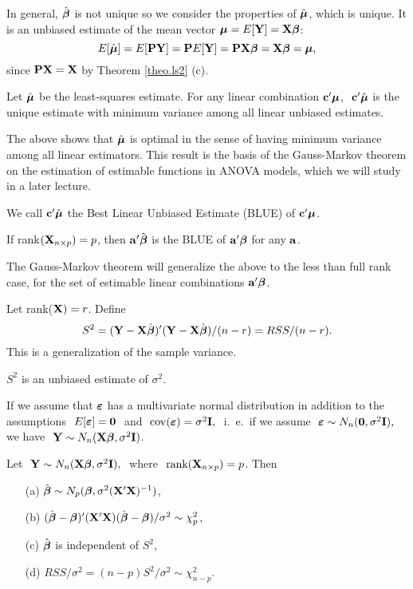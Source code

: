 \documentclass[11pt]{article}
\newcommand{\bdefi}{\vb\begin{defi}}
\newcommand{\esdefi}{\end{defi}}
\newcommand{\btheo}{\vb\begin{theo}}
\newcommand{\etheo}{\end{theo}\vb}
\newcommand{\bstheo}{\begin{theo}}
\newcommand{\estheo}{\end{theo}}
\newcommand{\bnote}{\vb\begin{note}}
\newcommand{\enote}{\end{note}\vb}
\newcommand{\bsnote}{\begin{note}}
\newcommand{\esnote}{\end{note}}
\begin{document}
\bnote
In general, $\hat{\mbox{\boldmath $\beta$}}$ is not unique so we consider the properties
of $\hat{\mbox{\boldmath $\mu$}}$, which is unique.  It is an unbiased estimate of the
mean vector $\mbox{\boldmath $\mu$}=E[\mathbf{Y}]=\mathbf{X}\mbox{\boldmath $\beta$}$:
$$ 
E[\hat{\mbox{\boldmath $\mu$}}] = E[\mathbf{P}\mathbf{Y}] = \mathbf{P} E[\mathbf{Y}] = \mathbf{P}\mathbf{X}\mbox{\boldmath $\beta$} =
\mathbf{X}\mbox{\boldmath $\beta$} = \mbox{\boldmath $\mu$},
$$
since $\mathbf{P}\mathbf{X}=\mathbf{X}$ by Theorem \ref{theo.ls2} (c).
\esnote

\btheo
Let $\hat{\mbox{\boldmath $\mu$}}$ be the least-squares estimate.  For any linear
combination $\mathbf{c}'\mbox{\boldmath $\mu$}$, $\ \bfc'\hat{\bfmu}$ is the unique estimate
with minimum variance among all linear unbiased estimates.
\estheo

\bsnote
The above shows that $\hat{\mbox{\boldmath $\mu$}}$ is optimal in the sense of having
minimum variance among all linear estimators.  This result is the
basis of the Gauss-Markov theorem on the estimation of estimable
functions in ANOVA models, which we will study in a later lecture.
\esnote

\bsnote
We call $\mathbf{c}'\hat{\mbox{\boldmath $\mu$}}$ the Best Linear Unbiased Estimate (BLUE) of
$\mathbf{c}'\mbox{\boldmath $\mu$}$.
\enote

\newpage

\btheo
If rank$(\mathbf{X}_{n\times p})=p$, then $\mathbf{a}'\hat{\mbox{\boldmath $\beta$}}$ is the BLUE of
$\mathbf{a}'\mbox{\boldmath $\beta$}$ for any $\mathbf{a}$.
\estheo

\bsnote
The Gauss-Markov theorem will generalize the above to the less than
full rank case, for the set of estimable linear combinations
$\mathbf{a}'\mbox{\boldmath $\beta$}$.
\enote

\bdefi
Let rank($\mathbf{X})=r$. Define 
$$S^2 = (\mathbf{Y}-\mathbf{X}\hat{\mbox{\boldmath $\beta$}})'(\mathbf{Y}-\mathbf{X}\hat{\mbox{\boldmath $\beta$}})/(n-r) =
RSS/(n-r).$$
This is a generalization of the sample variance.
\esdefi

\bstheo
$S^2$ is an unbiased estimate of $\sigma^2$.
\etheo

\bnote
If we assume that $\mbox{\boldmath $\varepsilon$}$ has a multivariate normal distribution in
addition to the assumptions $\ E[\mbox{\boldmath $\varepsilon$}]=\mathbf{0}\ $ and $\
\mathrm{cov}(\mbox{\boldmath $\varepsilon$})=\sigma^2\mathbf{I},\ $ i.~e.~if we assume $\ \mbox{\boldmath $\varepsilon$}\sim
N_n(\mathbf{0}, \sigma^2\mathbf{I}),\ $ we have $\ \bfY\sim N_n(\bfX\bfbet,
\sigma^2\bfI)$.
\esnote

\btheo
Let $\ \mathbf{Y}\sim N_n(\mathbf{X}\mbox{\boldmath $\beta$}, \sigma^2\mathbf{I}),\ $ where $\
\mbox{rank}(\mathbf{X}_{n \times p})=p$. Then
\begin{itemize}
\item[(a)]
$\hat{\mbox{\boldmath $\beta$}}\sim N_p(\mbox{\boldmath $\beta$},\sigma^2(\mathbf{X}'\mathbf{X})^{-1})$,
\item[(b)]
$(\hat{\mbox{\boldmath $\beta$}}-\mbox{\boldmath $\beta$})'(\mathbf{X}'\mathbf{X})(\hat{\mbox{\boldmath $\beta$}}-\mbox{\boldmath $\beta$})/\sigma^2
\sim \chi^2_p$,
\item[(c)]
$\hat{\mbox{\boldmath $\beta$}}$ is independent of $S^2$,
\item[(d)]
$RSS/\sigma^2=(n-p)S^2/\sigma^2 \sim \chi^2_{n-p}$.
\end{itemize}
\etheo
\end{document}
